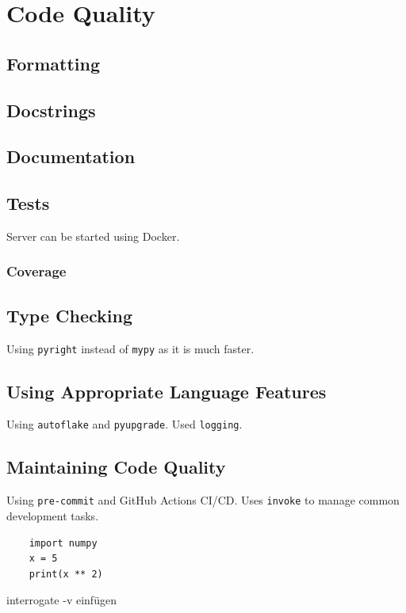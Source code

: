 \documentclass{prettytex/ox/mmsc-special-topic}
\begin{document}
  \section{Code Quality}
  \subsection{Formatting}
  \subsection{Docstrings}
  \subsection{Documentation}
  \subsection{Tests}
  Server can be started using Docker.

  \subsubsection{Coverage}
  \subsection{Type Checking}
  Using \texttt{pyright} instead of \texttt{mypy} as it is much faster.
  \subsection{Using Appropriate Language Features}
  Using \texttt{autoflake} and \texttt{pyupgrade}.
  Used \texttt{logging}.
  \subsection{Maintaining Code Quality}
  Using \texttt{pre-commit} and GitHub Actions CI/CD.
  Uses \texttt{invoke} to manage common development tasks.

  \begin{verbatim}
    import numpy
    x = 5
    print(x ** 2)
  \end{verbatim}

  interrogate -v einfügen
\end{document}
